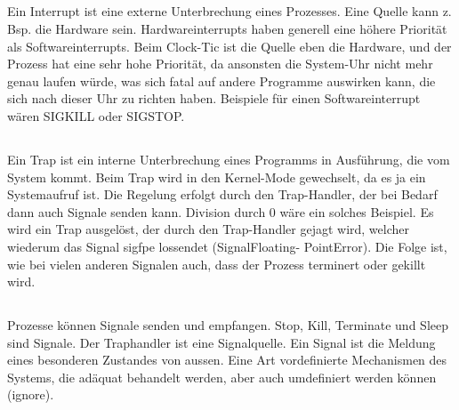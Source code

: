 \subsection{}
\begin{answer}
Ein Interrupt ist eine externe Unterbrechung eines Prozesses. Eine Quelle kann z. Bsp. die
Hardware sein. Hardwareinterrupts haben generell eine höhere Priorität als Softwareinterrupts.
Beim Clock-Tic ist die Quelle eben die Hardware, und der Prozess hat eine sehr hohe
Priorität, da ansonsten die System-Uhr nicht mehr genau laufen würde, was sich fatal auf
andere Programme auswirken kann, die sich nach dieser Uhr zu richten haben.
Beispiele für einen Softwareinterrupt wären SIGKILL oder SIGSTOP.
\end{answer}

\subsection{}
\begin{answer}
Ein Trap ist ein interne Unterbrechung eines Programms in Ausführung, die vom System
kommt. Beim Trap wird in den Kernel-Mode gewechselt, da es ja ein Systemaufruf ist.
Die Regelung erfolgt durch den Trap-Handler, der bei Bedarf dann auch Signale senden
kann. Division durch 0 wäre ein solches Beispiel. Es wird ein Trap ausgelöst, der durch den
Trap-Handler gejagt wird, welcher wiederum das Signal sigfpe lossendet (SignalFloating-
PointError). Die Folge ist, wie bei vielen anderen Signalen auch, dass der Prozess terminert
oder gekillt wird.
\end{answer}

\subsection{}
\begin{answer}
Prozesse können Signale senden und empfangen. Stop, Kill, Terminate und Sleep sind
Signale. Der Traphandler ist eine Signalquelle. Ein Signal ist die Meldung eines besonderen
Zustandes von aussen. Eine Art vordefinierte Mechanismen des Systems, die adäquat
behandelt werden, aber auch umdefiniert werden können (ignore).
\end{answer}

